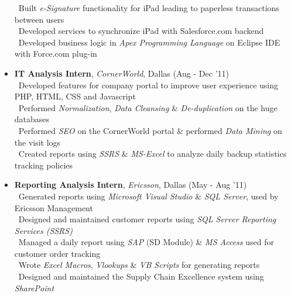 \documentclass[11pt]{article}
\begin{document}
\begin{itemize}
		\textendash\ Built \textit{e-Signature} functionality for iPad leading to paperless transactions between users\\
		\textendash\ Developed services to synchronize iPad with Salesforce.com backend\\
		\textendash\ Developed business logic in \textit{Apex Programming Language} on Eclipse IDE with Force.com plug-in\\
	\item{\textbf{IT Analysis Intern}, \textit{CornerWorld}, Dallas \hfill (Aug - Dec '11)}\\
		\textendash\ Developed features for company portal to improve user experience using PHP, HTML, CSS and Javascript\\
		\textendash\ Performed \textit{Normalization}, \textit{Data Cleansing} \& \textit{De-duplication} on the huge databases\\
 		\textendash\ Performed \textit{SEO} on the CornerWorld portal \& performed \textit{Data Mining} on the visit logs\\
		\textendash\ Created reports using \textit{SSRS} \& \textit{MS-Excel} to analyze daily backup statistics tracking policies\\
	\item{\textbf{Reporting Analysis Intern}, \textit{Ericsson}, Dallas \hfill (May - Aug 
	'11)}\\
		\textendash\ Generated reports using \textit{Microsoft Visual Studio} \& \textit{SQL Server}, used by Ericsson Management\\
		\textendash\ Designed and maintained customer reports using \textit{SQL Server Reporting Services (SSRS)}\\
		\textendash\ Managed a daily report using \textit{SAP} (SD Module) \& \textit{MS Access} used for customer order tracking\\
		\textendash\ Wrote \textit{Excel Macros}, \textit{Vlookups} \& \textit{VB Scripts} for generating reports\\
		\textendash\ Designed and maintained the Supply Chain Excellence system using \textit{SharePoint}\\

\end{itemize}
\end{document}
